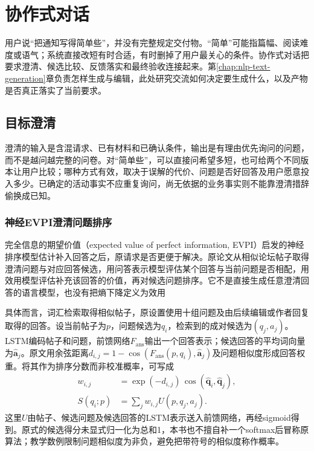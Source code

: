 \section{协作式对话}
\label{sec:nlp-dialogue-collaboration}

用户说“把通知写得简单些”，并没有完整规定交付物。“简单”可能指篇幅、阅读难度或语气；系统直接改短有时合适，有时删掉了用户最关心的条件。协作式对话把要求澄清、候选比较、反馈落实和最终验收连接起来。第\ref{chap:nlp-text-generation}章负责怎样生成与编辑，此处研究交流如何决定要生成什么，以及产物是否真正落实了当前要求。

\subsection{目标澄清}
\label{sec:nlp-dialogue-clarification}

澄清的输入是含混请求、已有材料和已确认条件，输出是有理由优先询问的问题，而不是越问越完整的问卷。对“简单些”，可以直接问希望多短，也可给两个不同版本让用户比较；哪种方式有效，取决于误解的代价、问题是否好回答及用户愿意投入多少。已确定的活动事实不应重复询问，尚无依据的业务事实则不能靠澄清措辞偷换成已知。

\subsubsection{神经EVPI澄清问题排序}
\label{sec:nlp-dialogue-evpi}

完全信息的期望价值（expected value of perfect information, EVPI）启发的神经排序模型估计补入回答之后，原请求是否更便于解决。原论文从相似论坛帖子取得澄清问题与对应回答候选，用问答表示模型评估某个回答与当前问题是否相配，用效用模型评估补充该回答的价值，再对候选问题排序。它不是直接生成任意澄清回答的语言模型，也没有把熵下降定义为效用

具体而言，词汇检索取得相似帖子，原设置使用十组问题及由后续编辑或作者回复取得的回答。设当前帖子为$p$，问题候选为$q_i$，检索到的成对候选为$(q_j,a_j)$。LSTM编码帖子和问题，前馈网络$F_{\mathrm{ans}}$输出一个回答表示；候选回答的平均词向量为$\widehat{\bm{a}}_j$。原文用余弦距离$d_{i,j}=1-\cos(F_{\mathrm{ans}}(p,q_i),\widehat{\bm{a}}_j)$及问题相似度形成回答权重。将其作为排序分数而非校准概率，可写成
\begin{equation}
\begin{aligned}
 w_{i,j}&=\exp(-d_{i,j})\,
            \cos(\widehat{\bm{q}}_i,\widehat{\bm{q}}_j),\\
 S(q_i;p)&=\sum_j w_{i,j}U(p,q_j,a_j).
\end{aligned}
\label{eq:nlp-dialogue-evpi}
\end{equation}
这里$U$由帖子、候选问题及候选回答的LSTM表示送入前馈网络，再经sigmoid得到。原式的候选得分未显式归一化为总和1，本书也不擅自补一个softmax后冒称原算法；教学数例限制问题相似度为非负，避免把带符号的相似度称作概率。

